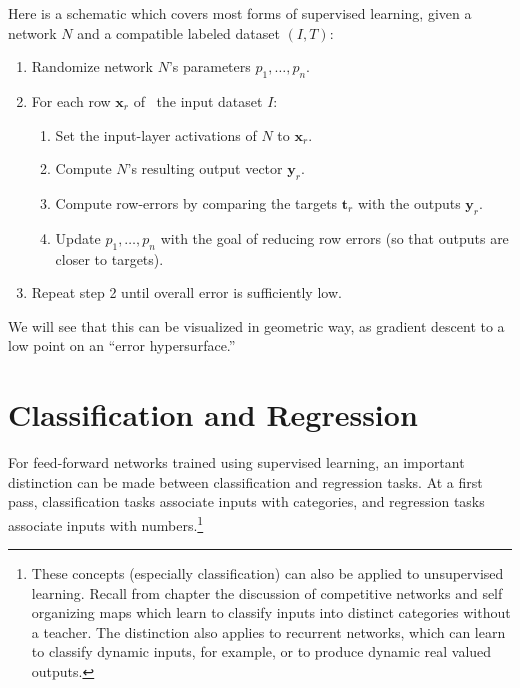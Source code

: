 Here is a schematic which covers most forms of supervised learning, given a network $N$ and a compatible labeled dataset $(I,T)$:
 \begin{enumerate}
\item Randomize network $N$'s parameters $p_1,\dots,p_n$.
\item For each row  $\mathbf{x}_r$  of  the input dataset $I$:
\begin{enumerate}
\item Set the input-layer activations of $N$ to $\mathbf{x}_r$.
\item Compute $N$'s resulting output vector $\mathbf{y}_r$. 
\item Compute row-errors by comparing the targets $\mathbf{t}_r$ with the outputs $\mathbf{y}_r$.
\item Update $p_1,\dots, p_n$ with the goal of reducing row errors (so that outputs are closer to targets). %
\end{enumerate}
\item Repeat step 2 until overall error is sufficiently low.
\end{enumerate}
	

We will see that this can be visualized in geometric way, as gradient descent to a low point on an ``error hypersurface.''

\section{Classification and Regression}\label{classificationRegression}

For feed-forward networks trained using supervised learning, an important distinction can be made between classification and regression tasks. At a first pass, classification tasks associate inputs with categories, and regression tasks associate inputs with numbers.\footnote{These concepts (especially classification) can also be applied to unsupervised learning. Recall from chapter  the discussion of competitive networks and self organizing maps which learn to classify inputs into distinct categories without a teacher. The distinction also applies to recurrent networks, which can learn to classify  dynamic inputs, for example, or to produce dynamic real valued outputs.} 

